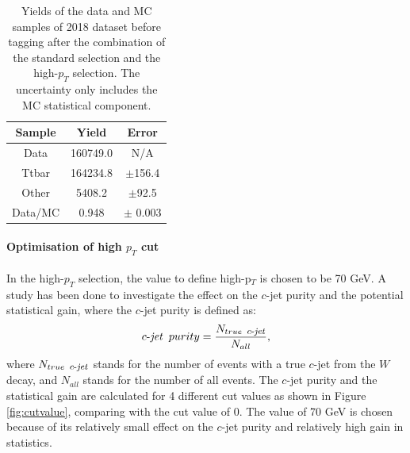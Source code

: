 \documentclass[letterpaper,12pt]{article}
\newcommand\cjetineq{\mathop{\mbox{$c$-$\mathit{jet}$}}}
\newcommand\cjetunder{\mathop{\footnotesize{\mbox{$c$-$\mathit{jet}$}}}\normalsize}
\begin{document}
 \begin{table}[h]
 \begin{centering}
 \begin{tabular}{c|c|c}
          \hline
          \hline
Sample &  Yield & Error \\ \hline   \hline      
Data   &  160749.0 & N/A\\ \hline
Ttbar  &  164234.8 &$\pm$156.4 \\ \hline
Other  &    5408.2 &$\pm$92.5 \\ \hline
Data/MC&   0.948   &$\pm$ 0.003 \\ \hline
 \end{tabular} 
 \caption{Yields of the data and MC samples of 2018 dataset before tagging after the combination of the standard selection and the high-$p_T$ selection. The uncertainty only includes the MC statistical component.} \label{tab:yields_highpT}
 \end{centering}
 \end{table}

\paragraph{Optimisation of high $p_{T}$ cut}
\label{cutvalue}

In the high-$p_{T}$ selection, the value to define high-p$_{T}$ is chosen to be 70 GeV. A study has been done to investigate the effect on the $c$-jet purity and the potential statistical gain, where the $c$-jet purity is defined as:
\begin{equation}
\cjetineq\ purity = \frac{N_{true\ \cjetunder}}{N_{all}},
\end{equation}
where $N_{true\ \cjetunder}$ stands for the number of events with a true $c$-jet from the $W$ decay, and $N_{all}$ stands for the number of all events. 
The $c$-jet purity and the statistical gain are calculated for 4 different cut values as shown in Figure \ref{fig:cutvalue}, comparing with the cut value of 0. The value of 70 GeV is chosen because of its relatively small effect on the $c$-jet purity and relatively high gain in statistics. 
\end{document}
